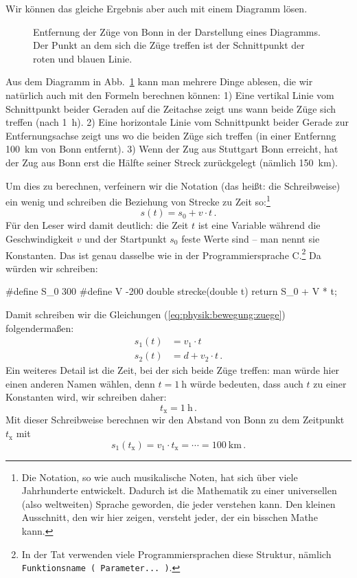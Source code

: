 Wir können das gleiche Ergebnis aber auch mit einem Diagramm lösen.
\begin{figure}[h]
    
    \caption{Entfernung der Züge von Bonn in der Darstellung eines Diagramms. Der Punkt an dem sich die Züge treffen ist der Schnittpunkt der roten und blauen Linie.}
    \label{img:physik:bewegung:zuege}
\end{figure}
Aus dem Diagramm in Abb.~\ref{img:physik:bewegung:zuege} kann man mehrere Dinge ablesen, die wir natürlich auch mit den Formeln berechnen können: 1) Eine vertikal Linie vom Schnittpunkt beider Geraden auf die Zeitachse zeigt uns wann beide Züge sich treffen (nach \qty{1}{\hour}). 2) Eine horizontale Linie vom Schnittpunkt beider Gerade zur Entfernungsachse zeigt uns wo die beiden Züge sich treffen (in einer Entfernng \qty{100}{km} von Bonn entfernt). 3) Wenn der Zug aus Stuttgart Bonn erreicht, hat der Zug aus Bonn erst die Hälfte seiner Streck zurückgelegt (nämlich \qty{150}{\km}).

Um dies zu berechnen, verfeinern wir die Notation (das heißt: die Schreibweise) ein wenig und schreiben die Beziehung von Strecke zu Zeit so:\footnote{%
    Die Notation, so wie auch musikalische Noten, hat sich über viele Jahrhunderte entwickelt. Dadurch ist die Mathematik zu einer universellen (also weltweiten) Sprache geworden, die jeder verstehen kann. Den kleinen Ausschnitt, den wir hier zeigen, versteht jeder, der ein bisschen Mathe kann.}
\begin{equation*}
    s(t) = s_0 + v\cdot t\,.
\end{equation*}
Für den Leser wird damit deutlich: die Zeit $t$ ist eine Variable während die Geschwindigkeit $v$ und der Startpunkt $s_0$ feste Werte sind -- man nennt sie Konstanten. Das ist genau dasselbe wie in der Programmiersprache C.\footnote{%
    In der Tat verwenden viele Programmiersprachen diese Struktur, nämlich \texttt{Funktionsname ( Parameter... )}. } %
Da würden wir schreiben:
\begin{code}[numbers=none]
    #define S_0 300
    #define V -200
    double strecke(double t) {
        return S_0 + V * t;
    }
\end{code}
Damit schreiben wir die Gleichungen (\ref{eq:physik:bewegung:zuege}) folgendermaßen:
\begin{equation}
    \begin{split}
        s_1(t) &= v_1\cdot t \\
        s_2(t) &= d + v_2\cdot t\,.
    \end{split}
\end{equation}
Ein weiteres Detail ist die Zeit, bei der sich beide Züge treffen: man würde hier einen anderen Namen wählen, denn $t = \qty{1}{\hour}$ würde bedeuten, dass auch $t$ zu einer Konstanten wird, wir schreiben daher:
\begin{equation*}
    t_\textrm{x} = \qty{1}{\hour} \,.
\end{equation*}
Mit dieser Schreibweise berechnen wir den Abstand von Bonn zu dem Zeitpunkt $t_\textrm{x}$ mit
\begin{equation*}
    s_1(t_\textrm{x}) = v_1\cdot t_\textrm{x} = \cdots = \qty{100}{\km} \,.
\end{equation*}

